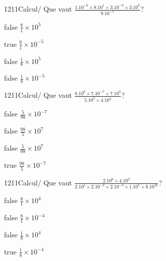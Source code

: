 \documentclass[11pt]{article}
\begin{document}
            \begin{question}{1211}{Calcul}{}{/}
                Que vaut $\frac{1.10^{-6}\times 8.10^{1}\times 3.10^{-9}\times 3.10^{8}}{9.10^{-1}}$?
            \end{question}
            
            \begin{reponses}
                \item[false] $\frac{8}{1}\times 10^{5}$
                \item[true] $\frac{8}{1}\times 10^{-5}$
                \item[false] $\frac{1}{8}\times 10^{5}$
                \item[false] $\frac{1}{8}\times 10^{-5}$
            \end{reponses}
            
            \begin{question}{1211}{Calcul}{}{/}
                Que vaut $\frac{8.10^{6}\times 7.10^{-7}\times 7.10^{0}}{5.10^{2}\times 4.10^{4}}$?
            \end{question}
            
            \begin{reponses}
                \item[false] $\frac{5}{98}\times 10^{-7}$
                \item[false] $\frac{98}{5}\times 10^{7}$
                \item[false] $\frac{5}{98}\times 10^{7}$
                \item[true] $\frac{98}{5}\times 10^{-7}$
            \end{reponses}
            
            \begin{question}{1211}{Calcul}{}{/}
                Que vaut $\frac{2.10^{6}\times 4.10^{0}}{2.10^{1}\times 2.10^{-3}\times 2.10^{-3}\times 1.10^{5}\times 8.10^{10}}$?
            \end{question}
            
            \begin{reponses}
                \item[false] $\frac{8}{1}\times 10^{4}$
                \item[false] $\frac{8}{1}\times 10^{-4}$
                \item[false] $\frac{1}{8}\times 10^{4}$
                \item[true] $\frac{1}{8}\times 10^{-4}$
            \end{reponses}
            
\end{document}

